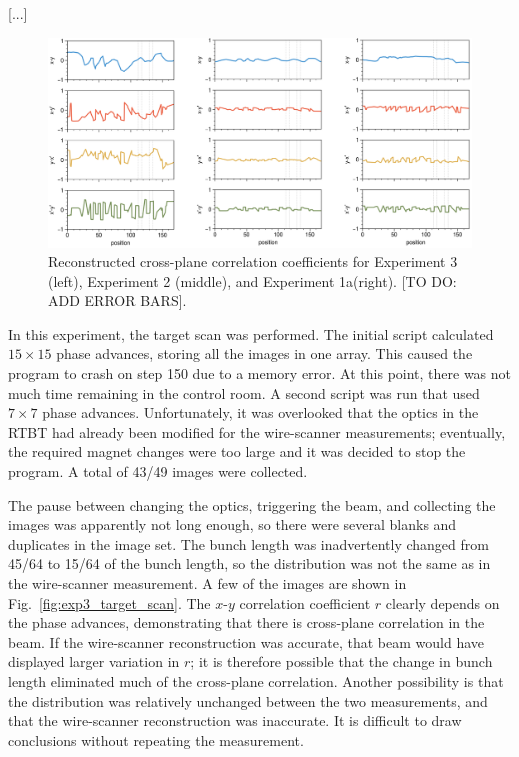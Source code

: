 [...]

%
\begin{figure}[!p]
    \centering
    \includegraphics[width=\textwidth]{Images/chapter5/exp3/compare_corr.png}
    \caption{Reconstructed cross-plane correlation coefficients for Experiment 3 (left), Experiment 2 (middle), and Experiment 1a(right). [TO DO: ADD ERROR BARS].}
    \label{fig:exp3_compare_corr}
\end{figure}
%

In this experiment, the target scan was performed. The initial script calculated $15 \times 15$ phase advances, storing all the images in one array. This caused the program to crash on step 150 due to a memory error. At this point, there was not much time remaining in the control room. A second script was run that used $7 \times 7$ phase advances. Unfortunately, it was overlooked that the optics in the RTBT had already been modified for the wire-scanner measurements; eventually, the required magnet changes were too large and it was decided to stop the program. A total of 43/49 images were collected.


The pause between changing the optics, triggering the beam, and collecting the images was apparently not long enough, so there were several blanks and duplicates in the image set. The bunch length was inadvertently changed from 45/64 to 15/64 of the bunch length, so the distribution was not the same as in the wire-scanner measurement. A few of the images are shown in Fig.~\ref{fig:exp3_target_scan}. The $x$-$y$ correlation coefficient $r$ clearly depends on the phase advances, demonstrating that there is cross-plane correlation in the beam. If the wire-scanner reconstruction was accurate, that beam would have displayed larger variation in $r$; it is therefore possible that the change in bunch length eliminated much of the cross-plane correlation. Another possibility is that the distribution was relatively unchanged between the two measurements, and that the wire-scanner reconstruction was inaccurate. It is difficult to draw conclusions without repeating the measurement. 


